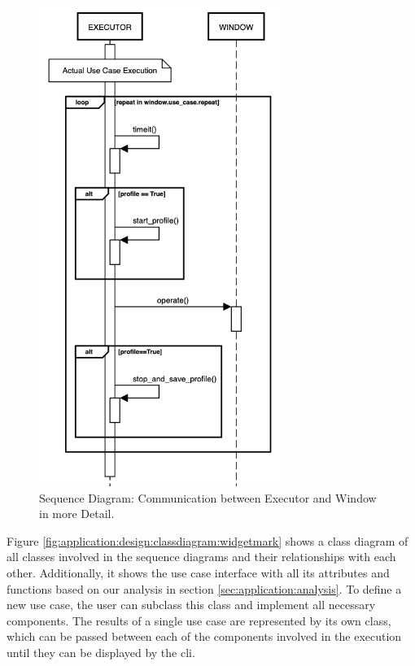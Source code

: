 \begin{figure}[h]
    \centering
    \includegraphics[width=8cm]{resources/img/sequence/executor}
    \caption{
        Sequence Diagram: Communication between Executor and Window in more
        Detail.
    }
    \label{fig:application:design:executor}
\end{figure}

Figure \ref{fig:application:design:classdiagram:widgetmark} shows a class
diagram of all classes involved in the sequence diagrams and their relationships
with each other. Additionally, it shows the use case interface with all its
attributes and functions based on our analysis in section
\ref{sec:application:analysis}. To define a new use case, the user can subclass
this class and implement all necessary components. The results of a single use
case are represented by its own class, which can be passed between each of the
components involved in the execution until they can be displayed by the \gls{cli}.

